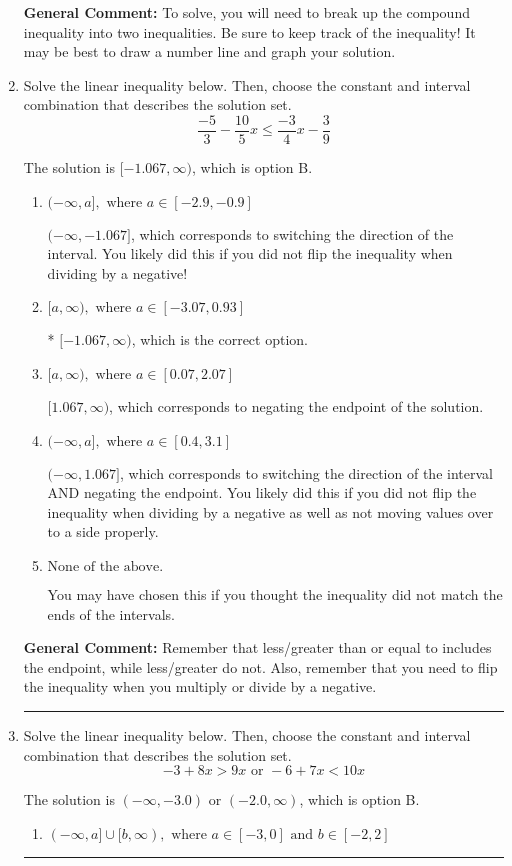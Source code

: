 \documentclass{extbook}[14pt]
\newcommand{\litem}[1]{\item #1

\rule{\textwidth}{0.4pt}}
\begin{document}
\begin{enumerate}
{\textbf{General Comment:} To solve, you will need to break up the compound inequality into two inequalities. Be sure to keep track of the inequality! It may be best to draw a number line and graph your solution.
}
\litem{
Solve the linear inequality below. Then, choose the constant and interval combination that describes the solution set.
\[ \frac{-5}{3} - \frac{10}{5} x \leq \frac{-3}{4} x - \frac{3}{9} \]

The solution is \( [-1.067, \infty) \), which is option B.\begin{enumerate}[label=\Alph*.]
\item \( (-\infty, a], \text{ where } a \in [-2.9, -0.9] \)

 $(-\infty, -1.067]$, which corresponds to switching the direction of the interval. You likely did this if you did not flip the inequality when dividing by a negative!
\item \( [a, \infty), \text{ where } a \in [-3.07, 0.93] \)

* $[-1.067, \infty)$, which is the correct option.
\item \( [a, \infty), \text{ where } a \in [0.07, 2.07] \)

 $[1.067, \infty)$, which corresponds to negating the endpoint of the solution.
\item \( (-\infty, a], \text{ where } a \in [0.4, 3.1] \)

 $(-\infty, 1.067]$, which corresponds to switching the direction of the interval AND negating the endpoint. You likely did this if you did not flip the inequality when dividing by a negative as well as not moving values over to a side properly.
\item \( \text{None of the above}. \)

You may have chosen this if you thought the inequality did not match the ends of the intervals.
\end{enumerate}

\textbf{General Comment:} Remember that less/greater than or equal to includes the endpoint, while less/greater do not. Also, remember that you need to flip the inequality when you multiply or divide by a negative.
}
\litem{
Solve the linear inequality below. Then, choose the constant and interval combination that describes the solution set.
\[ -3 + 8 x > 9 x \text{ or } -6 + 7 x < 10 x \]

The solution is \( (-\infty, -3.0) \text{ or } (-2.0, \infty) \), which is option B.\begin{enumerate}[label=\Alph*.]
\item \( (-\infty, a] \cup [b, \infty), \text{ where } a \in [-3, 0] \text{ and } b \in [-2, 2] \)


\end{enumerate}}
\end{enumerate}
\end{document}
